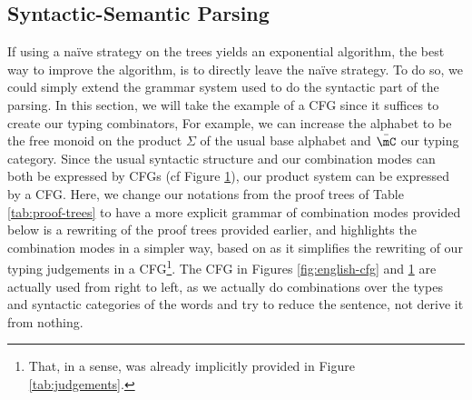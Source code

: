 \subsection{Syntactic-Semantic Parsing}
\label{subsec:ssparsing}
If using a naïve strategy on the trees yields an exponential algorithm,
the best way to improve the algorithm, is to directly leave the naïve strategy.
To do so, we could simply extend the grammar system used to do the syntactic
part of the parsing.
In this section, we will take the example of a CFG since it suffices to create
our typing combinators,
For example, we can increase the alphabet to be the free monoid on the product
$\Sigma$ of the usual base alphabet and $\bar{\mC}$ our typing category.
Since the usual syntactic structure and our combination modes can both be
expressed by CFGs (cf Figure \ref{fig:combination-cfg}), our product system
can be expressed by a CFG.
Here, we change our notations from the proof trees of Table
\ref{tab:proof-trees} to have a more explicit grammar of combination modes
provided below is a rewriting of the proof trees provided earlier, and
highlights the combination modes in a simpler way, based on
\cite{bumfordEffectdrivenInterpretationFunctors2025} as it simplifies the
rewriting of our typing judgements in a CFG\footnote{That, in a sense, was
	already implicitly provided in Figure \ref{tab:judgements}.}.
The CFG in Figures \ref{fig:english-cfg} and \ref{fig:combination-cfg} are actually
used from right to left, as we actually do combinations over the types and
syntactic categories of the words and try to reduce the sentence, not derive it from
nothing.

\begin{figure}
	\centering
	\caption{}\label{fig:combination-cfg}
\end{figure}

